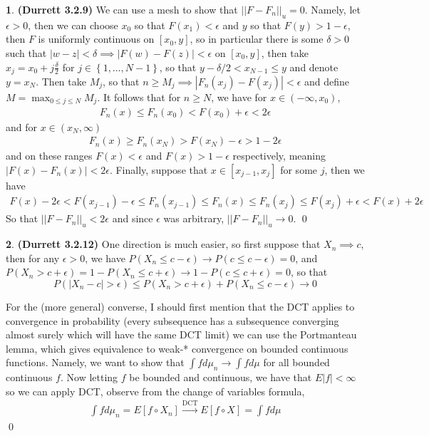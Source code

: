 \documentclass{article}
\theoremstyle{definition}
\newtheorem{pb}{}
\newcommand{\set}[1]{\left\{#1\right\}}
\newcommand{\abs}[1]{\left\vert#1\right\vert}
\newcommand{\norm}[1]{\lvert\lvert#1\rvert\rvert}
\begin{document}
    \begin{pb}\textbf{(Durrett 3.2.9)}
        We can use a mesh to show that \(\norm{F - F_n}_u = 0\). Namely, let \(\epsilon > 0\), then we can choose \(x_0\) so that \(F(x_1) < \epsilon\) and \(y\) so that \(F(y) > 1 - \epsilon\), then \(F\) is uniformly continuous on \([x_0,y]\), so in particular there is some \(\delta > 0\) such that \(\abs{w - z} < \delta \implies \abs{F(w) - F(z)} < \epsilon\) on \([x_0,y]\), then take \(x_j = x_0 + j\frac{\delta}{2}\) for \(j \in \set{1,\hdots,N-1}\), so that \(y - \delta/2 < x_{N-1} \leq y\) and denote \(y = x_N\). Then take \(M_j\), so that \(n \geq M_j \implies \abs{F_n(x_j) - F(x_j)} < \epsilon\) and define \(M = \max_{0 \leq j \leq N}M_j\). It follows that for \(n \geq N\), we have for \(x \in (-\infty,x_0)\),
        \begin{align*}
            F_n(x) \leq F_n(x_0) < F(x_0) + \epsilon < 2 \epsilon
        \end{align*}
        and for \(x \in (x_N,\infty)\)
        \begin{align*}
            F_n(x) \geq F_n(x_N) > F(x_N) - \epsilon > 1- 2 \epsilon
        \end{align*}
        and on these ranges \(F(x) < \epsilon\) and \(F(x) > 1 - \epsilon\) respectively, meaning \(\abs{F(x) - F_n(x)} < 2 \epsilon\). Finally, suppose that \(x \in [x_{j-1},x_j]\) for some \(j\), then we have
        \begin{align*}
            F(x) - 2 \epsilon < F(x_{j-1}) - \epsilon \leq F_n(x_{j-1}) \leq F_n(x) \leq F_n(x_j) \leq F(x_j) + \epsilon < F(x) + 2 \epsilon
        \end{align*}
        So that \(\norm{F - F_n}_u < 2 \epsilon\) and since \(\epsilon\) was arbitrary, \(\norm{F -F_n}_u \to 0\). \qed
    \end{pb}
    \begin{pb}\textbf{(Durrett 3.2.12)}
        One direction is much easier, so first suppose that \(X_n \implies c\), then for any \(\epsilon > 0\), we have \(P(X_n \leq c - \epsilon) \to P(c \leq c - \epsilon) = 0\), and \(P(X_n > c + \epsilon) = 1 - P(X_n \leq c + \epsilon) \to 1 - P(c \leq c + \epsilon) = 0\), so that \[P(\abs{X_n - c} > \epsilon) \leq P(X_n > c + \epsilon) + P(X_n \leq c - \epsilon) \to 0\]

        For the (more general) converse, I should first mention that the DCT applies to convergence in probability (every subsequence has a subsequence converging almost surely which will have the same DCT limit) we can use the Portmanteau lemma, which gives equivalence to weak-* convergence on bounded continuous functions. Namely, we want to show that \(\int f d\mu_n \to \int f d\mu\) for all bounded continuous \(f\). Now letting \(f\) be bounded and continuous, we have that \(E\abs{f} < \infty\) so we can apply DCT, observe from the change of variables formula,
        \begin{align*}
            \int fd\mu_n = E[f\circ X_n] \overset{\text{DCT}}{\longrightarrow} E[f\circ X] = \int fd\mu
        \end{align*} \qed
    \end{pb}
\end{document}
